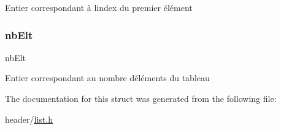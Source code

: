 Entier correspondant à l\textquotesingle{}index du premier élément \mbox{\label{structlist_a600e1520c855931c7b4a1ee93780b1b9}} 
\subsubsection{\texorpdfstring{nb\+Elt}{nbElt}}
{\footnotesize\ttfamily nb\+Elt}

Entier correspondant au nombre d\textquotesingle{}éléments du tableau 

The documentation for this struct was generated from the following file\+:\begin{DoxyCompactItemize}
\item 
header/\hyperlink{list_8h}{list.\+h}\end{DoxyCompactItemize}

